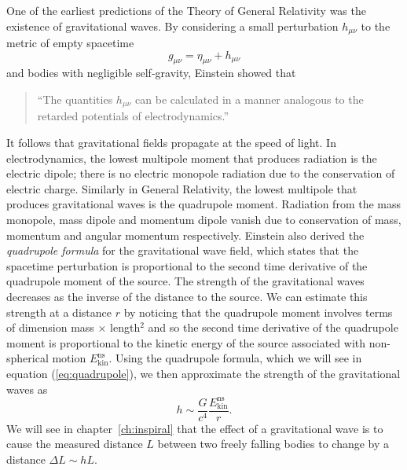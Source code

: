 One of the earliest predictions of the Theory of General Relativity was the
existence of gravitational waves. By considering a small perturbation
$h_{\mu\nu}$ to the metric of empty spacetime
\begin{equation}
g_{\mu\nu} = \eta_{\mu\nu} + h_{\mu\nu}
\end{equation}
and bodies with negligible self-gravity, Einstein showed
that\cite{Einstein:1916}
\begin{quotation}
``The quantities $h_{\mu\nu}$ can be calculated in a manner analogous to the
retarded potentials of electrodynamics.''
\end{quotation}
It follows that
gravitational fields propagate at the speed of light.  In electrodynamics, the
lowest multipole moment that produces radiation is the electric dipole; there
is no electric monopole radiation due to the conservation of electric charge.
Similarly in General Relativity, the lowest multipole that produces
gravitational waves is the quadrupole moment. Radiation from the 
mass monopole, mass dipole and momentum dipole vanish due to conservation of
mass, momentum and angular momentum respectively. Einstein also derived the
\emph{quadrupole formula} for the gravitational wave field, which states that
the spacetime perturbation is proportional to the second time derivative of
the quadrupole moment of the source.  The strength of the gravitational waves
decreases as the inverse of the distance to the source.  We can estimate
this strength at a distance $r$ by noticing that the quadrupole moment
involves terms of dimension mass $\times$ length$^2$ and so the second time
derivative of the quadrupole moment is proportional to the kinetic energy of
the source associated with non-spherical motion $E^\mathrm{ns}_\mathrm{kin}$.
Using the quadrupole formula, which we will see in equation
(\ref{eq:quadrupole}), we then approximate the strength of the gravitational
waves as
\begin{equation}
h \sim \frac{G}{c^4}\frac{E^\mathrm{ns}_\mathrm{kin}}{r}.
\label{eq:strainest}
\end{equation}
We will see in chapter~\ref{ch:inspiral} that the effect of a
gravitational wave is to cause the measured distance $L$ between two freely
falling bodies to change by a distance $\Delta L \sim h L$. 

